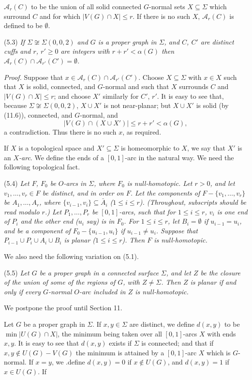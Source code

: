 \noindent $\mathscr{A}_r(C)$ to be the union of all solid connected $G$-normal sets $X \subseteq \Sigma$ which surround $C$ and for which $|V(G) \cap X| \le r$. If there is no such $X$, $\mathscr{A}_r(C)$ is defined to be $\emptyset$.

\stmt
(5.3) \textit{If $\Sigma \not\cong \Sigma(0, 0, 2)$ and $G$ is a proper graph in $\Sigma$, and $C$, $C'$ are distinct cuffs and $r$, $r' \ge 0$ are integers with $r + r' < \alpha(G)$ then $\mathscr{A}_r(C) \cap \mathscr{A}_{r'}(C') = \emptyset$.}

\textit{Proof.} Suppose that $x \in \mathscr{A}_r(C) \cap \mathscr{A}_{r'}(C')$. Choose $X \subseteq \Sigma$ with $x \in X$ such that $X$ is solid, connected, and $G$-normal and such that $X$ surrounds $C$ and $|V(G) \cap X| \le r$; and choose $X'$ similarly for $C'$, $r'$. It is easy to see that, because $\Sigma \not\cong \Sigma(0, 0, 2)$, $X \cup X'$ is not near-planar; but $X \cup X'$ is solid (by (11.6)), connected, and $G$-normal, and
\begin{equation*}
|V(G) \cap (X \cup X')| \le r + r' < \alpha(G),
\end{equation*}
a contradiction. Thus there is no such $x$, as required.

If $X$ is a topological space and $X' \subseteq \Sigma$ is homeomorphic to $X$, we say that $X'$ is an \textit{$X$-arc}. We define the ends of a $[0, 1]$-arc in the natural way. We need the following topological fact.

\stmt
(5.4) \textit{Let $F$, $F_0$ be $O$-arcs in $\Sigma$, where $F_0$ is null-homotopic. Let $r > 0$, and let $v_1, \dots, v_r \in F$ be distinct, and in order on $F$. Let the components of $F - \{v_1, \dots, v_r\}$ be $A_1, \dots, A_r$, where $\{v_{i-1}, v_i\} \subseteq \bar{A}_i$ ($1 \le i \le r$). (Throughout, subscripts should be read modulo $r$.) Let $P_1, \dots, P_r$ be $[0, 1]$-arcs, such that for $1 \le i \le r$, $v_i$ is one end of $P_i$ and the other end ($u_i$ say) is in $F_0$. For $1 \le i \le r$, let $B_i = \emptyset$ if $u_{i-1} = u_i$, and be a component of $F_0 - \{u_{i-1}, u_i\}$ if $u_{i-1} \ne u_i$. Suppose that $P_{i-1} \cup P_i \cup A_i \cup B_i$ is planar ($1 \le i \le r$). Then $F$ is null-homotopic.}

We also need the following variation on (5.1).

\stmt
(5.5) \textit{Let $G$ be a proper graph in a connected surface $\Sigma$, and let $Z$ be the closure of the union of some of the regions of $G$, with $Z \ne \Sigma$. Then $Z$ is planar if and only if every $G$-normal $O$-arc included in $Z$ is null-homotopic.}

We postpone the proof until Section 11.

Let $G$ be a proper graph in $\Sigma$. If $x, y \in \Sigma$ are distinct, we define $d(x, y)$ to be $\min |U(G) \cap X|$, the minimum being taken over all $[0, 1]$-arcs $X$ with ends $x, y$. It is easy to see that $d(x, y)$ exists if $\Sigma$ is connected; and that if $x, y \notin U(G) - V(G)$ the minimum is attained by a $[0, 1]$-arc $X$ which is $G$-normal. If $x = y$, we .define $d(x, y) = 0$ if $x \notin U(G)$, and $d(x, y) = 1$ if $x \in U(G)$. If
